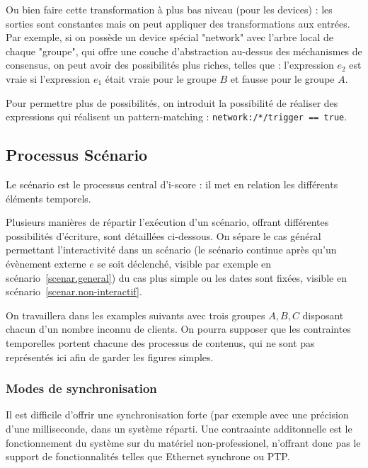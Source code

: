 \documentclass{article}
\begin{document}
Ou bien faire cette transformation à plus bas niveau (pour les devices) : les sorties sont constantes mais on peut appliquer des transformations aux entrées.
Par exemple, si on possède un device spécial "network" avec l'arbre local de chaque "groupe", qui offre une couche d'abstraction au-dessus des méchanismes de consensus, on peut avoir des possibilités plus riches, telles que : l'expression $e_2$ est vraie si l'expression $e_1$ était vraie pour le groupe $B$ et fausse pour le groupe $A$.

Pour permettre plus de possibilités, on introduit la possibilité de réaliser des expressions qui réalisent un pattern-matching : 
\lstinline|network:/*/trigger == true|.

\subsection{Processus Scénario}
Le scénario est le processus central d'i-score : il met en relation les différents éléments temporels.

Plusieurs manières de répartir l'exécution d'un scénario, offrant différentes possibilités d'écriture, sont détaillées ci-dessous. On sépare le cas général permettant l'interactivité dans un scénario (le scénario continue après qu'un évènement externe $e$ se soit déclenché, visible par exemple en scénario~\ref{scenar.general}) du cas plus simple ou les dates sont fixées, visible en scénario~\ref{scenar.non-interactif}.

On travaillera dans les examples suivants avec trois groupes $A,B,C$ disposant chacun d'un nombre inconnu de clients. 
On pourra supposer que les contraintes temporelles portent chacune des processus de contenus, qui ne sont pas représentés ici afin de garder les figures simples.

\subsubsection{Modes de synchronisation}
Il est difficile d'offrir une synchronisation forte (par exemple avec une précision d'une milliseconde, dans un système réparti\cite{sheehy2015there}. Une contraainte additonnelle est le fonctionnement du système sur du matériel non-professionel, n'offrant donc pas le support de fonctionnalités telles que Ethernet synchrone ou PTP.
\end{document}
